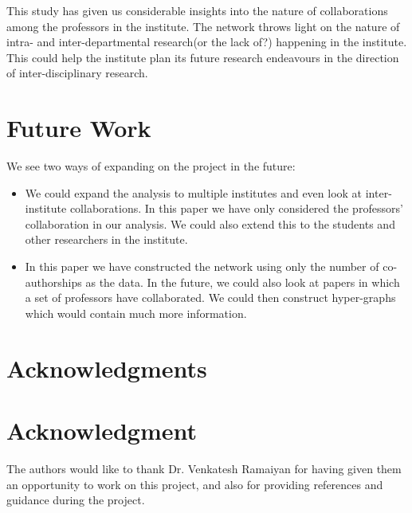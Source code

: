 \documentclass[conference,compsoc]{IEEEtran}
\begin{document}
This study has given us considerable insights into the nature of collaborations among the professors in the institute. The network throws light on the nature of intra- and inter-departmental research(or the lack of?) happening in the institute. This could help the institute plan its future research endeavours in the direction of inter-disciplinary research.


\section{Future Work}
We see two ways of expanding on the project in the future:
\begin{itemize}
\item We could expand the analysis to multiple institutes and even look at inter-institute collaborations. In this paper we have only considered the professors' collaboration in our analysis. We could also extend this to the students and other researchers in the institute.
\item In this paper we have constructed the network using only the number of co-authorships as the data. In the future, we could also look at papers in which a set of professors have collaborated. We could then construct hyper-graphs which would contain much more information.  
\end{itemize}






\ifCLASSOPTIONcompsoc
  \section*{Acknowledgments}
\else
  \section*{Acknowledgment}
\fi


The authors would like to thank Dr. Venkatesh Ramaiyan for having given them an opportunity to work on this project, and also for providing references and guidance during the project.





\end{document}
